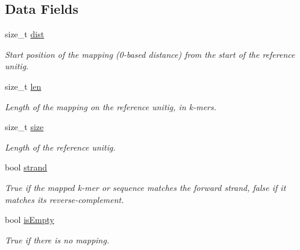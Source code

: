 \subsection*{Data Fields}
\begin{DoxyCompactItemize}
\item 
\mbox{\label{structUnitigMapBase_a5c53f906934df35588b34fc42a89a4a0}} 
size\+\_\+t \hyperlink{structUnitigMapBase_a5c53f906934df35588b34fc42a89a4a0}{dist}
\begin{DoxyCompactList}\small\item\em Start position of the mapping (0-\/based distance) from the start of the reference unitig. \end{DoxyCompactList}\item 
\mbox{\label{structUnitigMapBase_a06a9beaf07e8ae56aa6578b922c2b7c0}} 
size\+\_\+t \hyperlink{structUnitigMapBase_a06a9beaf07e8ae56aa6578b922c2b7c0}{len}
\begin{DoxyCompactList}\small\item\em Length of the mapping on the reference unitig, in k-\/mers. \end{DoxyCompactList}\item 
\mbox{\label{structUnitigMapBase_adf6bc2dfe176302491c81142fc2e84cc}} 
size\+\_\+t \hyperlink{structUnitigMapBase_adf6bc2dfe176302491c81142fc2e84cc}{size}
\begin{DoxyCompactList}\small\item\em Length of the reference unitig. \end{DoxyCompactList}\item 
\mbox{\label{structUnitigMapBase_a6de6f4a1ccef220e84d097bc3ef0fb3f}} 
bool \hyperlink{structUnitigMapBase_a6de6f4a1ccef220e84d097bc3ef0fb3f}{strand}
\begin{DoxyCompactList}\small\item\em True if the mapped k-\/mer or sequence matches the forward strand, false if it matches its reverse-\/complement. \end{DoxyCompactList}\item 
\mbox{\label{structUnitigMapBase_ade629940b2611494dbf233cb1144da80}} 
bool \hyperlink{structUnitigMapBase_ade629940b2611494dbf233cb1144da80}{is\+Empty}
\begin{DoxyCompactList}\small\item\em True if there is no mapping. \end{DoxyCompactList}\end{DoxyCompactItemize}


